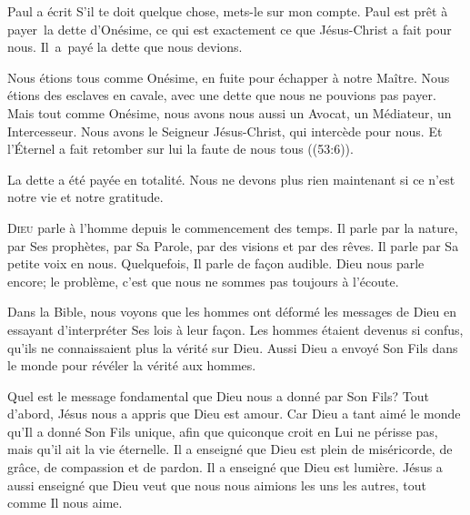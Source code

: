 
Paul a écrit\frcolon{} 
 \Og S'il 
 te doit quelque chose, mets-le sur mon compte. \Fg{}
 Paul est prêt à payer~la dette d'Onésime,
 ce qui est 
 exactement ce que Jésus-Christ a fait pour nous.
 Il~a~payé la dette que nous devions. 

Nous étions tous comme Onésime, en fuite pour échapper à notre Maître.
 Nous étions des esclaves en cavale, avec une dette que nous ne pouvions
 pas payer.
 Mais tout comme Onésime, nous avons nous aussi un Avocat, un Médiateur,
 un Intercesseur. Nous avons le Seigneur Jésus-Christ,
 qui intercède pour nous.
 \Og Et l'Éternel a fait retomber sur lui la faute de nous tous \Fg{}
 ((53:6)). 

La dette a été payée en totalité.
 Nous ne devons plus rien maintenant
 \ocadr si ce n'est notre vie et notre gratitude.

\dvrule






\lettrine{D}{ieu} parle à l'homme depuis le commencement des temps.
 Il parle par la nature, par Ses prophètes, par Sa Parole, par des visions
 et par des rêves.
 Il parle par Sa petite voix en nous. Quelquefois, Il parle de fa\c{c}on audible.
 Dieu nous parle encore; le problème, c'est que nous ne sommes pas toujours
 à l'écoute. 

Dans la Bible, nous voyons que les hommes ont déformé les messages de Dieu
 en essayant d'interpréter Ses lois à leur fa\c{c}on.
 Les hommes étaient devenus si confus, qu'ils ne connaissaient plus
 la vérité sur Dieu.
 Aussi Dieu a envoyé Son Fils dans le monde
 pour révéler la vérité aux hommes. 


Quel est le message fondamental que Dieu nous a donné par Son Fils?
 Tout d'abord, Jésus nous a appris que Dieu est amour.
 \Og Car Dieu a tant aimé le monde qu'Il a donné Son Fils unique,
 afin que quiconque croit en Lui ne périsse pas, mais qu'il ait
 la vie éternelle. \Fg{}
 Il a enseigné que Dieu est plein de miséricorde, de grâce,
 de compassion et de pardon. Il a enseigné que Dieu est lumière.
 Jésus a aussi enseigné que Dieu veut que nous nous aimions
 les uns les autres, tout comme Il nous aime. 

